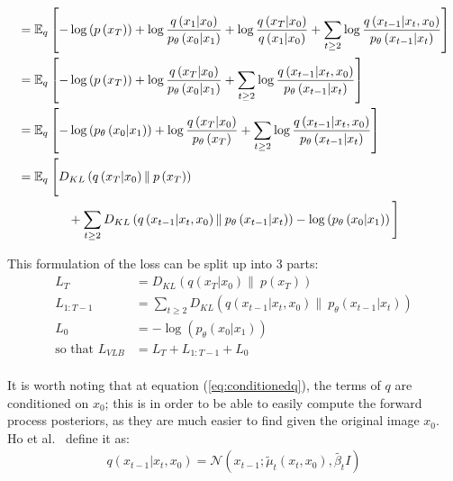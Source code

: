 \documentclass[twoside]{article}
\numberwithin{equation}{section}
\numberwithin{figure}{section}
\begin{document}
\begin{align}
  &= \mathbb{E}_q \left[-\log\left(p \left(x_T\right)\right) + \log \frac{q\left(x_1 | x_0\right)}{p_{\theta}\left(x_0 | x_1\right)} + \log \frac{q\left(x_T | x_0\right)}{q\left(x_1 | x_0\right)} + \sum_{t \geq 2} \log \frac{q\left(x_{t-1} | x_t, x_0\right)}{p_{\theta}\left(x_{t-1} | x_t\right)}\right] \\
  &= \mathbb{E}_q \left[-\log\left(p \left(x_T\right)\right) + \log \frac{q\left(x_T | x_0\right)}{p_{\theta}\left(x_0 | x_1\right)} + \sum_{t \geq 2} \log \frac{q\left(x_{t-1} | x_t, x_0\right)}{p_{\theta}\left(x_{t-1} | x_t\right)}\right] \\
  &= \mathbb{E}_q \left[- \log\left(p_{\theta}\left(x_0 | x_1\right)\right) + \log \frac{q\left(x_T | x_0\right)}{p_{\theta}\left(x_T\right)} + \sum_{t \geq 2} \log \frac{q\left(x_{t-1} | x_t, x_0\right)}{p_{\theta}\left(x_{t-1} | x_t\right)}\right] \\
  &= \mathbb{E}_q \: \Bigg[ D_{KL}\left(q\left(x_T | x_0\right) \| \: p\left(x_T\right)\right) \Bigg.  \\
  &\qquad \qquad \Bigg. + \sum_{t \geq 2} D_{KL}\left(q\left(x_{t-1} | x_t, x_0\right) \| \: p_{\theta}\left(x_{t-1} | x_t\right)\right) - \log\left(p_{\theta}\left(x_0 | x_1\right)\right) \Bigg] \notag
\end{align}

This formulation of the loss can be split up into 3 parts:
\begin{align}
  L_T &= D_{KL}\left(q\left(x_T | x_0\right) \| \: p\left(x_T\right)\right) \label{eq:lT}\\
  L_{1:T-1} &= \sum_{t \geq 2} D_{KL}\left(q\left(x_{t-1} | x_t, x_0\right) \| \: p_{\theta}\left(x_{t-1} | x_t\right)\right) \\
  L_0 &=  - \log\left(p_{\theta}\left(x_0 | x_1\right)\right) \\
  \text{so that } L_{VLB} &= L_T + L_{1:T-1} + L_0
\end{align}
\\
It is worth noting that at equation (\ref{eq:conditionedq}), the terms of $q$ are conditioned on $x_0$; this is in order to be able to easily compute the forward process posteriors, as they are much easier to find given the original image $x_0$. \\
Ho et al.~\cite{ho2020denoising} define it as:
\begin{gather}
  q\left(x_{t-1} | x_t, x_0\right) = \mathcal{N}\left(x_{t-1}; \tilde{\mu}_t \left(x_t, x_0\right), \tilde{\beta_t} I\right)
\end{gather}
\end{document}
